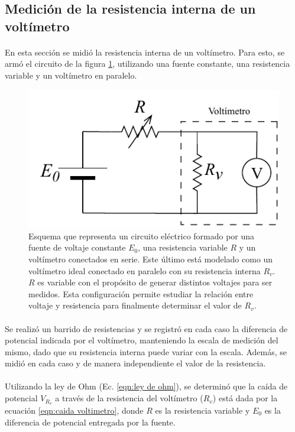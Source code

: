 \subsection{Medición de la resistencia interna de un voltímetro}\label{sec:resistencia de volt}

\paragraph{}
En esta sección se midió la resistencia interna de un voltímetro. Para esto, se armó el circuito de la figura \ref{fig:esq_voltimetro}, utilizando una fuente constante, una resistencia variable y un voltímetro en paralelo.

\begin{figure}[H]
    \centering
    \includegraphics[width = 0.5\linewidth]{Esquemas/ResistenciaVoltimetro.pdf}
    \caption{Esquema que representa un circuito eléctrico formado por una fuente de voltaje constante $E_0$, una resistencia variable $R$ y un voltímetro conectados en serie. Este último está modelado como un voltímetro ideal conectado en paralelo con su resistencia interna $R_v$. $R$ es variable con el propósito de generar distintos voltajes para ser medidos. Esta configuración permite estudiar la relación entre voltaje y resistencia para finalmente determinar el valor de $R_v$.}
    \label{fig:esq_voltimetro}
\end{figure}
\paragraph{}
Se realizó un barrido de resistencias y se registró en cada caso la diferencia de potencial indicada por el voltímetro, manteniendo la escala de medición del mismo, dado que su resistencia interna puede variar con la escala. Además, se midió en cada caso y de manera independiente el valor de la resistencia.
\paragraph{}
Utilizando la ley de Ohm (Ec. \ref{eqn:ley de ohm}), se determinó que la caída de potencial $V_{R_v}$ a través de la resistencia del voltímetro ($R_v$) está dada por la ecuación  \ref{eqn:caida voltimetro}, donde $R$ es la resistencia variable y $E_0$ es la diferencia de potencial entregada por la fuente.

